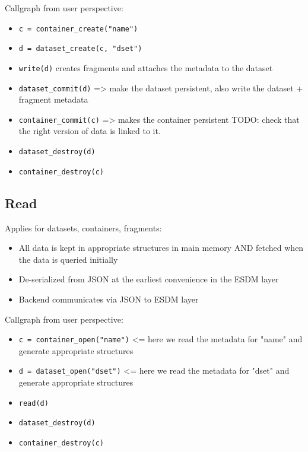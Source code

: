 Callgraph from user perspective:

\begin{itemize}
  \item \lstinline|c = container_create("name")|
  \item \lstinline|d = dataset_create(c, "dset")|
  \item \lstinline|write(d)| creates fragments and attaches the metadata to the dataset
  \item \lstinline|dataset_commit(d)| =\textgreater{} make the dataset persistent, also write the dataset + fragment metadata
  \item \lstinline|container_commit(c)| =\textgreater{} makes the container persistent
    TODO: check that the right version of data is linked to it.
  \item \lstinline|dataset_destroy(d)|
  \item \lstinline|container_destroy(c)|
\end{itemize}

\subsection{Read}%
\label{read}

Applies for datasets, containers, fragments:

\begin{itemize}
  \item All data is kept in appropriate structures in main memory AND fetched when the data is queried initially
  \item De-serialized from JSON at the earliest convenience in the ESDM layer
  \item Backend communicates via JSON to ESDM layer
\end{itemize}

Callgraph from user perspective:

\begin{itemize}
  \item \lstinline|c = container_open("name")| \textless= here we read the metadata for "name" and generate appropriate structures
  \item \lstinline|d = dataset_open("dset")| \textless= here we read the metadata for "dset" and generate appropriate structures
  \item \lstinline|read(d)|
  \item \lstinline|dataset_destroy(d)|
  \item \lstinline|container_destroy(c)|
\end{itemize}

